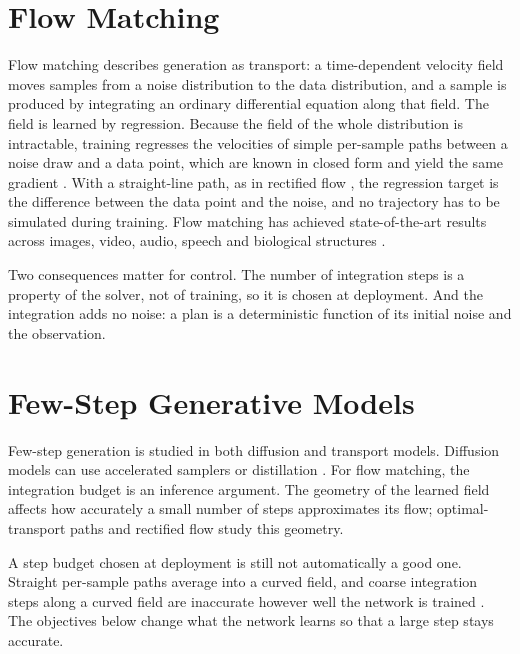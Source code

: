 \documentclass[headsepline,footsepline,footinclude=false,oneside,fontsize=11pt,paper=a4,listof=totoc,bibliography=totoc]{scrbook}
\theoremstyle{definition}
\theoremstyle{plain}
\theoremstyle{remark}
\begin{document}
\section{Flow Matching}\label{sec:bg:fm}

Flow matching \parencite{lipman2023flow,lipman2024guide} describes generation as transport: a
time-dependent velocity field moves samples from a noise distribution to the data distribution, and a
sample is produced by integrating an ordinary differential equation along that field. The field is
learned by regression. Because the field of the whole distribution is intractable, training regresses
the velocities of simple per-sample paths between a noise draw and a data point, which are known in
closed form and yield the same gradient \parencite{lipman2023flow}. With a straight-line path, as in
rectified flow \parencite{liu2023flow}, the regression target is the difference between the data point
and the noise, and no trajectory has to be simulated during training. Flow matching has achieved
state-of-the-art results across images, video, audio, speech and biological structures
\parencite{lipman2024guide}.

Two consequences matter for control. The number of integration steps is a property of the solver, not
of training, so it is chosen at deployment. And the integration adds no noise: a plan is a
deterministic function of its initial noise and the observation.

\section{Few-Step Generative Models}\label{sec:bg:fewstep}

Few-step generation is studied in both diffusion and transport models. Diffusion models can use
accelerated samplers \parencite{song2021denoising} or distillation \parencite{wang2024onedp}.
For flow matching, the integration budget is an inference argument. The geometry of the learned
field affects how accurately a small number of steps approximates its flow; optimal-transport paths
\parencite{lipman2023flow} and rectified flow \parencite{liu2023flow} study this geometry.

A step budget chosen at deployment is still not automatically a good one. Straight per-sample paths
average into a curved field, and coarse integration steps along a curved field are inaccurate however
well the network is trained \parencite[Sec.~3]{geng2025meanflow}. The objectives below change what the
network learns so that a large step stays accurate.
\end{document}
